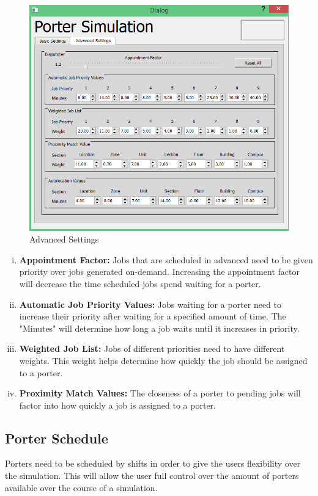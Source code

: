 \documentclass[paper=letter, fontsize=10pt]{scrartcl}
\numberwithin{equation}{section}		%
\numberwithin{figure}{section}			%
\numberwithin{table}{section}				%
\begin{document}
	\begin{figure}[!htbp]
	\begin{center}
		\includegraphics[width=1\columnwidth, height=0.48\textheight, keepaspectratio]{AdvancedSettings.png}
		\caption{Advanced Settings}
	\end{center}
	\end{figure} 
	\begin{enumerate}[(i)]
		\item \textbf{Appointment Factor:} Jobs that are scheduled in advanced need to be given priority over jobs generated on-demand.  Increasing the appointment factor will decrease the time scheduled jobs spend waiting for a porter.
		\item \textbf{Automatic Job Priority Values:} Jobs waiting for a porter need to increase their priority after waiting for a specified amount of time.  The "Minutes" will determine how long a job waits until it increases in priority.
		\item \textbf{Weighted Job List:} Jobs of different priorities need to have different weights.  This weight helps determine how quickly the job should be assigned to a porter.
		\item \textbf{Proximity Match Values:} The closeness of a porter to pending jobs will factor into how quickly a job is assigned to a porter.
	\end{enumerate}
	
	\subsection{Porter Schedule}
	Porters need to be scheduled by shifts in order to give the users flexibility over the simulation.  This will allow the user full control over the amount of porters available over the course of a simulation.
	
\end{document}
